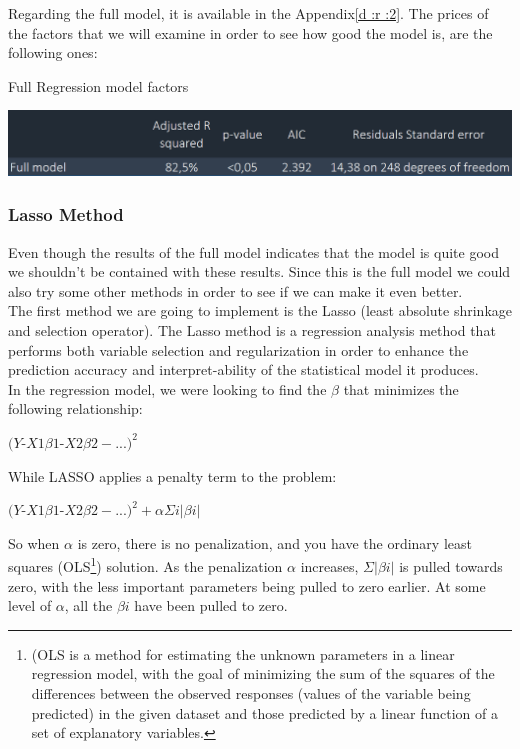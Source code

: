 \documentclass{book}
\begin{document}
Regarding the full model, it is available in the Appendix\ref{d :r :2}. The prices of the factors that we will examine in order to see how good the model is, are the following ones:
\begin{table}[H]
\centering
\caption{Full Regression model factors}
\includegraphics[scale=0.6]{../R/photos/0001_f.PNG} 
\end{table}

\subsubsection{Lasso Method}
Even though the results of the full model indicates that the model is quite good we shouldn't be contained with these results. Since this is the full model we could also try some other methods in order to see if we can make it even better.\\
The first method we are going to implement is the Lasso (least absolute shrinkage and selection operator). The Lasso method is a regression analysis method that performs both variable selection and regularization in order to enhance the prediction accuracy and interpret-ability of the statistical model it produces.\\
In the regression model, we were looking to find the $β$ that minimizes the following relationship:
\begin{center}
$(Y${-}$X1\beta 1${-}$X2\beta 2−...)^{2}$
\end{center}
While LASSO applies a penalty term to the problem:
\begin{center}
$(Y${-}$X1\beta 1${-}$X2\beta 2−...)^{2}+\alpha\Sigma i|\beta i|$
\end{center}
So when $\alpha$ is zero, there is no penalization, and you have the ordinary least squares (OLS\footnote{(OLS is a method for estimating the unknown parameters in a linear regression model, with the goal of minimizing the sum of the squares of the differences between the observed responses (values of the variable being predicted) in the given dataset and those predicted by a linear function of a set of explanatory variables.}) solution. As the penalization $\alpha$ increases, $\Sigma|\beta i|$ is pulled towards zero, with the less important parameters being pulled to zero earlier. At some level of $\alpha$, all the $βi$ have been pulled to zero.\\
\end{document}
